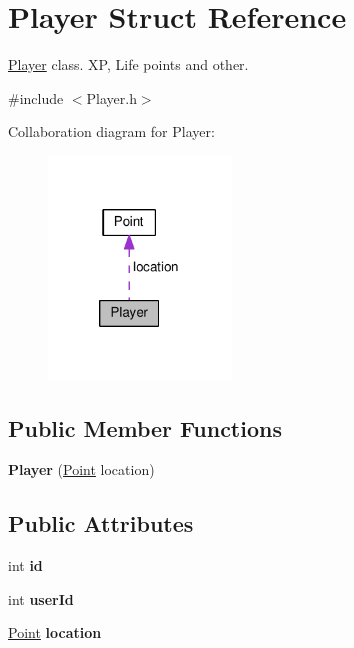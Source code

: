\hypertarget{struct_player}{\section{Player Struct Reference}
\label{struct_player}
}


\hyperlink{struct_player}{Player} class. X\-P, Life points and other.  




{\ttfamily \#include $<$Player.\-h$>$}



Collaboration diagram for Player\-:
\nopagebreak
\begin{figure}[H]
\begin{center}
\leavevmode
\includegraphics[width=138pt]{struct_player__coll__graph}
\end{center}
\end{figure}
\subsection*{Public Member Functions}
\begin{DoxyCompactItemize}
\item 
\hypertarget{struct_player_ad1c9500a9f02f1055209e1d0e33e27e5}{{\bfseries Player} (\hyperlink{struct_point}{Point} location)}\label{struct_player_ad1c9500a9f02f1055209e1d0e33e27e5}

\end{DoxyCompactItemize}
\subsection*{Public Attributes}
\begin{DoxyCompactItemize}
\item 
\hypertarget{struct_player_a05e05f3a23de78da7ec032ec2bcf8c6c}{int {\bfseries id}}\label{struct_player_a05e05f3a23de78da7ec032ec2bcf8c6c}

\item 
\hypertarget{struct_player_a5c801c5fa6666baddd65a2863cc6e7f2}{int {\bfseries user\-Id}}\label{struct_player_a5c801c5fa6666baddd65a2863cc6e7f2}

\item 
\hypertarget{struct_player_adfb7d7a2aa0757fa7bf5a570b74528db}{\hyperlink{struct_point}{Point} {\bfseries location}}\label{struct_player_adfb7d7a2aa0757fa7bf5a570b74528db}

\end{DoxyCompactItemize}


